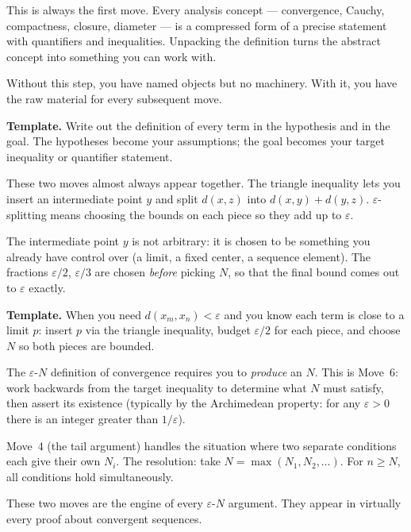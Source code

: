 \begin{remark}
This is always the first move. Every analysis concept --- convergence,
Cauchy, compactness, closure, diameter --- is a compressed form of
a precise statement with quantifiers and inequalities. Unpacking the
definition turns the abstract concept into something you can work with.

Without this step, you have named objects but no machinery. With it,
you have the raw material for every subsequent move.

\textbf{Template.} Write out the definition of every term in the
hypothesis and in the goal. The hypotheses become your assumptions;
the goal becomes your target inequality or quantifier statement.
\end{remark}

\begin{remark}
These two moves almost always appear together. The triangle inequality
lets you insert an intermediate point $y$ and split $d(x,z)$ into
$d(x,y) + d(y,z)$. $\varepsilon$-splitting means choosing the bounds
on each piece so they add up to $\varepsilon$.

The intermediate point $y$ is not arbitrary: it is chosen to be something
you already have control over (a limit, a fixed center, a sequence element).
The fractions $\varepsilon/2$, $\varepsilon/3$ are chosen \emph{before}
picking $N$, so that the final bound comes out to $\varepsilon$ exactly.

\textbf{Template.} When you need $d(x_m, x_n) < \varepsilon$ and you
know each term is close to a limit $p$: insert $p$ via the triangle
inequality, budget $\varepsilon/2$ for each piece, and choose $N$ so
both pieces are bounded.
\end{remark}

\begin{remark}
The $\varepsilon$-$N$ definition of convergence requires you to \emph{produce}
an $N$. This is Move~6: work backwards from the target inequality to
determine what $N$ must satisfy, then assert its existence
(typically by the Archimedean property: for any $\varepsilon > 0$
there is an integer greater than $1/\varepsilon$).

Move~4 (the tail argument) handles the situation where two separate
conditions each give their own $N_i$. The resolution: take
$N = \max(N_1, N_2, \ldots)$. For $n \geq N$, all conditions hold
simultaneously.

These two moves are the engine of every $\varepsilon$-$N$ argument.
They appear in virtually every proof about convergent sequences.
\end{remark}

